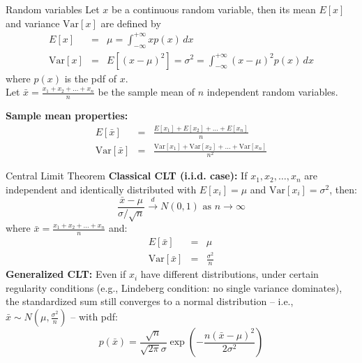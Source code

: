 \documentclass{beamer}
\begin{document}
\begin{frame}{Random variables}
  Let $x$ be a continuous random variable, then its mean $E[x]$ and variance $\text{Var}[x]$ are defined by
  \begin{eqnarray*}
    E[x] & = & \mu = \int_{-\infty}^{+\infty} x p(x) \, dx \\
    \text{Var}[x] & = & E[(x-\mu)^2] = \sigma^2 = \int_{-\infty}^{+\infty} (x-\mu)^2 p(x) \, dx
  \end{eqnarray*}
  where $p(x)$ is the pdf of $x$.\\
  \vspace{0.5cm}
  Let $\bar{x} = \frac{x_1 + x_2 + \ldots + x_n}{n}$ be the sample mean of $n$ independent random variables.

\textbf{Sample mean properties:}
\begin{eqnarray*}
E[\bar{x}] &=& \frac{E[x_1]+E[x_2]+\ldots+E[x_n]}{n} \\
\text{Var}[\bar{x}] &=& \frac{\text{Var}[x_1]+\text{Var}[x_2]+\ldots+\text{Var}[x_n]}{n^2}
\end{eqnarray*}  
\end{frame}

\begin{frame}{Central Limit Theorem}
\textbf{Classical CLT (i.i.d. case):}
If $x_1, x_2, \ldots, x_n$ are independent and identically distributed with $E[x_i] = \mu$ and $\text{Var}[x_i] = \sigma^2$, then:
$$\frac{\bar{x} - \mu}{\sigma/\sqrt{n}} \xrightarrow{d} N(0,1) \text{ as } n \to \infty$$
where $\bar{x} = \frac{x_1 + x_2 + \ldots + x_n}{n}$ and:
\begin{eqnarray*}
E[\bar{x}] &=& \mu \\
\text{Var}[\bar{x}] &=& \frac{\sigma^2}{n}
\end{eqnarray*}
\textbf{Generalized CLT:}
Even if $x_i$ have different distributions, under certain regularity conditions (e.g., Lindeberg condition: no single variance dominates), the standardized sum still converges to a normal distribution -- i.e., $\bar{x}\sim N(\mu,\frac{\sigma^2}{n})$ -- with pdf:
$$p(\bar{x}) = \frac{\sqrt{n}}{\sqrt{2\pi}\sigma} \exp\left(-\frac{n(\bar{x}-\mu)^2}{2\sigma^2}\right)$$
\end{frame}
\end{document}
